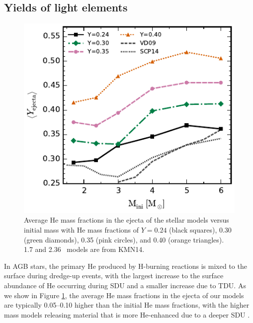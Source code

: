 \subsection{Yields of light elements}\label{sec:resultslightelements}
\begin{figure}
 \begin{center}\includegraphics[width=\columnwidth]{fig-yieldhelium.pdf}\end{center}
 \caption{Average He mass fractions in the ejecta of the stellar models versus initial mass with He mass fractions of $Y= 0.24$ (black squares), 0.30 (green diamonds), 0.35 (pink circles), and 0.40 (orange triangles). 1.7 and 2.36 \Msun\ models are from KMN14.}\label{fig:yieldhelium}
\end{figure}

In AGB stars, the primary He produced by H-burning reactions is mixed to the surface during dredge-up events, with the largest increase to the surface abundance of He occurring during SDU and a smaller increase due to TDU. As we show in Figure \ref{fig:yieldhelium}, the average He mass fractions in the ejecta of our models are typically 0.05--0.10 higher than the initial He mass fractions, with the higher mass models releasing material that is more He-enhanced due to a deeper SDU \citep{Karakas:2006fg}.

